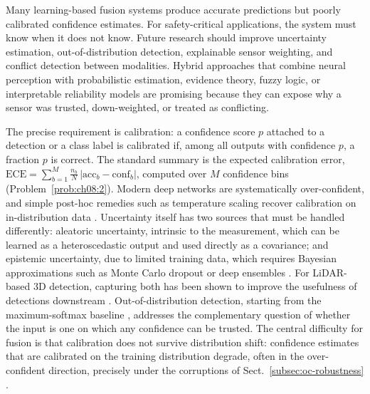 \documentclass[graybox,envcountchap]{style/SNmono}
\begin{document}
Many learning-based fusion systems produce accurate predictions but poorly calibrated confidence estimates. For safety-critical applications, the system must know when it does not know. Future research should improve uncertainty estimation, out-of-distribution detection, explainable sensor weighting, and conflict detection between modalities. Hybrid approaches that combine neural perception with probabilistic estimation, evidence theory, fuzzy logic, or interpretable reliability models are promising because they can expose why a sensor was trusted, down-weighted, or treated as conflicting.

The precise requirement is calibration: a confidence score $p$ attached to a detection or a class label is calibrated if, among all outputs with confidence $p$, a fraction $p$ is correct. The standard summary is the expected calibration error, $\mathrm{ECE}=\sum_{b=1}^{M}\frac{n_b}{N}\,\lvert\mathrm{acc}_b-\mathrm{conf}_b\rvert$, computed over $M$ confidence bins (Problem~\ref{prob:ch08:2}). Modern deep networks are systematically over-confident, and simple post-hoc remedies such as temperature scaling recover calibration on in-distribution data \cite{guo2017_calibration}. Uncertainty itself has two sources that must be handled differently: aleatoric uncertainty, intrinsic to the measurement, which can be learned as a heteroscedastic output and used directly as a covariance; and epistemic uncertainty, due to limited training data, which requires Bayesian approximations such as Monte Carlo dropout \cite{gal2016_mcdropout} or deep ensembles \cite{lakshminarayanan2017_ensembles,kendall2017_uncertainties}. For LiDAR-based 3D detection, capturing both has been shown to improve the usefulness of detections downstream \cite{feng2018_lidar_uncertainty}. Out-of-distribution detection, starting from the maximum-softmax baseline \cite{hendrycks2017_ood}, addresses the complementary question of whether the input is one on which any confidence can be trusted. The central difficulty for fusion is that calibration does not survive distribution shift: confidence estimates that are calibrated on the training distribution degrade, often in the over-confident direction, precisely under the corruptions of Sect.~\ref{subsec:oc-robustness} \cite{ovadia2019_shift}.
\end{document}
